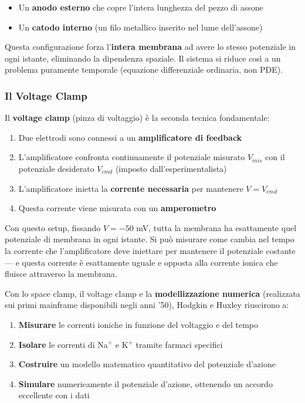 \begin{itemize}
    \item Un \textbf{anodo esterno} che copre l'intera lunghezza del pezzo di assone
    \item Un \textbf{catodo interno} (un filo metallico inserito nel lume dell'assone)
\end{itemize}

Questa configurazione forza l'\textbf{intera membrana} ad avere lo stesso potenziale in ogni istante, eliminando la dipendenza spaziale. Il sistema si riduce così a un problema puramente temporale (equazione differenziale ordinaria, non PDE).

\subsubsection{Il Voltage Clamp}

Il \textbf{voltage clamp} (pinza di voltaggio) è la seconda tecnica fondamentale:

\begin{enumerate}
    \item Due elettrodi sono connessi a un \textbf{amplificatore di feedback}
    \item L'amplificatore confronta continuamente il potenziale misurato $V_{mis}$ con il potenziale desiderato $V_{cmd}$ (imposto dall'esperimentalista)
    \item L'amplificatore inietta la \textbf{corrente necessaria} per mantenere $V = V_{cmd}$
    \item Questa corrente viene misurata con un \textbf{amperometro}
\end{enumerate}

\begin{tcolorbox}[colback=gray!5, colframe=gray!40, arc=2mm, boxrule=0.5pt]
 Con questo setup, fissando $V = -50$ mV, tutta la membrana ha esattamente quel potenziale di membrana in ogni istante. Si può misurare come cambia nel tempo la corrente che l'amplificatore deve iniettare per mantenere il potenziale costante — e questa corrente è esattamente uguale e opposta alla corrente ionica che fluisce attraverso la membrana.
\end{tcolorbox}



Con lo space clamp, il voltage clamp e la \textbf{modellizzazione numerica} (realizzata sui primi mainframe disponibili negli anni '50), Hodgkin e Huxley riuscirono a:
\begin{enumerate}
    \item \textbf{Misurare} le correnti ioniche in funzione del voltaggio e del tempo
    \item \textbf{Isolare} le correnti di Na$^+$ e K$^+$ tramite farmaci specifici
    \item \textbf{Costruire} un modello matematico quantitativo del potenziale d'azione
    \item \textbf{Simulare} numericamente il potenziale d'azione, ottenendo un accordo eccellente con i dati
\end{enumerate}

